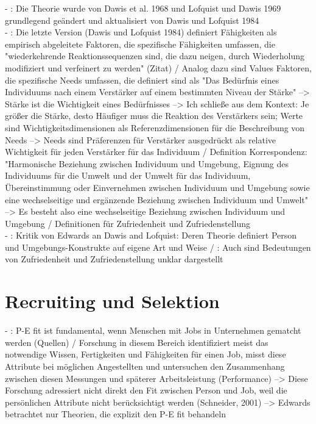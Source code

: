 - \cite[S. 29ff.]{edwards:2008}: Die Theorie wurde von Dawis et al. 1968 und Lofquist und Dawis 1969 grundlegend geändert und aktualisiert von Dawis und Lofquist 1984 \\
- \cite[S. 31]{edwards:2008}: Die letzte Version (Dawis und Lofquist 1984) definiert Fähigkeiten als empirisch abgeleitete Faktoren, die spezifische Fähigkeiten umfassen, die "wiederkehrende Reaktionssequenzen sind, die dazu neigen, durch Wiederholung modifiziert und verfeinert zu werden" (Zitat) / Analog dazu sind Values Faktoren, die spezifische Needs umfassen, die definiert sind als "Das Bedürfnis eines Individuums nach einem Verstärker auf einem bestimmten Niveau der Stärke" --> Stärke ist die Wichtigkeit eines Bedürfnisses --> Ich schließe aus dem Kontext: Je größer die Stärke, desto Häufiger muss die Reaktion des Verstärkers sein; Werte sind Wichtigkeitsdimensionen als Referenzdimensionen für die Beschreibung von Needs --> Needs sind Präferenzen für Verstärker ausgedrückt als relative Wichtigkeit für jeden Verstärker für das Individuum / Definition Korrespondenz: "Harmonische Beziehung zwischen Individuum und Umgebung, Eignung des Individuums für die Umwelt und der Umwelt für das Individuum, Übereinstimmung oder Einvernehmen zwischen Individuum und Umgebung sowie eine wechselseitige und ergänzende Beziehung zwischen Individuum und Umwelt" --> Es besteht also eine wechselseitige Beziehung zwischen Individuum und Umgebung / Definitionen für Zufriedenheit und Zufriedenstellung \\
- \cite[S. 32]{edwards:2008}: Kritik von Edwards an Dawis and Lofquist: Deren Theorie definiert Person und Umgebungs-Konstrukte auf eigene Art und Weise / \cite[S. 33]{edwards:2008}:  Auch sind Bedeutungen von Zufriedenheit und Zufriedenstellung unklar dargestellt

\section{Recruiting und Selektion}
\label{ch:notizen:rekcruitingUndSelektion}
- \cite[S. 33]{edwards:2008}: P-E fit ist fundamental, wenn Menschen mit Jobs in Unternehmen gematcht werden (Quellen) / Forschung in diesem Bereich identifiziert meist das notwendige Wissen, Fertigkeiten und Fähigkeiten für einen Job, misst diese Attribute bei möglichen Angestellten und untersuchen den Zusammenhang zwischen diesen Messungen und späterer Arbeitsleistung (Performance) --> Diese Forschung adressiert nicht direkt den Fit zwischen Person und Job, weil die persönlichen Attribute nicht berücksichtigt werden (Schneider, 2001) --> Edwards betrachtet nur Theorien, die explizit den P-E fit behandeln

